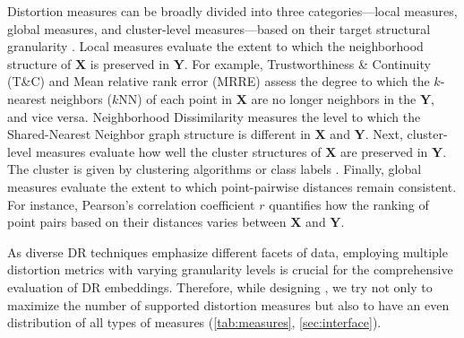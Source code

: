 Distortion measures can be broadly divided into three categories---local measures, global measures, and cluster-level measures---based on their target structural granularity \cite{jeon21tvcg}. 
Local measures evaluate the extent to which the neighborhood structure of $\mathbf{X}$ is preserved in $\mathbf{Y}$. For example, Trustworthiness \& Continuity (T\&C) \cite{venna06nn} and  Mean relative rank error (MRRE) \cite{lee09neurocomputing} assess the degree to which the $k$-nearest neighbors ($k$NN) of each point in $\mathbf{X}$ are no longer neighbors in the $\mathbf{Y}$, and vice versa. Neighborhood Dissimilarity \cite{fujiwara23pvis} measures the level to which the Shared-Nearest Neighbor \cite{ertoz02siam} graph structure is different in $\mathbf{X}$ and $\mathbf{Y}$. 
Next, cluster-level measures evaluate how well the cluster structures of $\mathbf{X}$ are preserved in $\mathbf{Y}$. The cluster is given by clustering algorithms \cite{jeon21tvcg} or class labels \cite{ joia11tvcg}.
Finally, global measures evaluate the extent to which point-pairwise distances remain consistent. For instance, Pearson's correlation coefficient $r$ quantifies how the ranking of point pairs based on their distances varies between $\mathbf{X}$ and $\mathbf{Y}$. 


As diverse DR techniques emphasize different facets of data, employing multiple distortion metrics with varying granularity levels is crucial for the comprehensive evaluation of DR embeddings. Therefore, while designing \library, we try not only to maximize the number of supported distortion measures but also to have an even distribution of all types of measures (\autoref{tab:measures}, \autoref{sec:interface}). 





